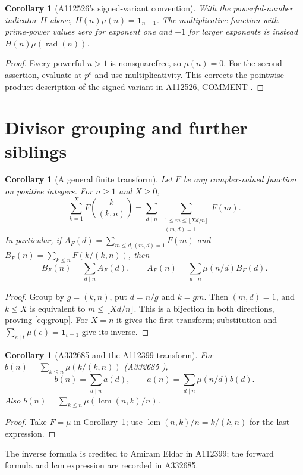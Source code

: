 \documentclass[11pt]{article}
\newtheorem{corollary}[theorem]{Corollary}
\newcommand{\mob}{\mu}
\newcommand{\rad}{\operatorname{rad}}
\begin{document}
\begin{corollary}[A112526's signed-variant convention]\label{cor:signed}
With the powerful-number indicator $H$ above,
$H(n)\mob(n)=\mathbf1_{n=1}$.
The multiplicative function with prime-power values zero for exponent
one and $-1$ for larger exponents is instead $H(n)\mob(\rad(n))$.
\end{corollary}
\begin{proof}
Every powerful $n>1$ is nonsquarefree, so $\mob(n)=0$.
For the second assertion, evaluate at $p^e$ and use multiplicativity.
This corrects the pointwise-product description of the signed variant
in A112526, COMMENT \cite{triangle-aux}.
\end{proof}

\section{Divisor grouping and further siblings}
\begin{corollary}[A general finite transform]\label{cor:group}
Let $F$ be any complex-valued function on positive integers. For $n\geq1$
and $X\geq0$,
\begin{equation}\label{eq:group}
 \sum_{k=1}^{X}F\!\left(\frac{k}{(k,n)}\right)
 =\sum_{d\mid n}\ \sum_{\substack{1\leq m\leq\lfloor Xd/n\rfloor\\(m,d)=1}}F(m).
\end{equation}
In particular, if $A_F(d)=\sum_{m\leq d,(m,d)=1}F(m)$ and
$B_F(n)=\sum_{k\leq n}F(k/(k,n))$, then
\begin{equation}\label{eq:general-transform}
 B_F(n)=\sum_{d\mid n}A_F(d),\qquad
 A_F(n)=\sum_{d\mid n}\mob(n/d)B_F(d).
\end{equation}
\end{corollary}
\begin{proof}
Group by $g=(k,n)$, put $d=n/g$ and $k=gm$.
Then $(m,d)=1$, and $k\leq X$ is equivalent to
$m\leq\lfloor Xd/n\rfloor$. This is a bijection in both directions,
proving \eqref{eq:group}. For $X=n$ it gives the first transform;
substitution and $\sum_{e\mid t}\mob(e)=\mathbf1_{t=1}$ give its inverse.
\end{proof}

\begin{corollary}[A332685 and the A112399 transform]\label{cor:transform}
For $b(n)=\sum_{k\leq n}\mob(k/(k,n))$ (A332685 \cite{a332685}),
\begin{equation}\label{eq:transform}
 b(n)=\sum_{d\mid n}a(d),\qquad
 a(n)=\sum_{d\mid n}\mob(n/d)b(d).
\end{equation}
Also $b(n)=\sum_{k\leq n}\mob(\operatorname{lcm}(n,k)/n)$.
\end{corollary}
\begin{proof}
Take $F=\mob$ in Corollary~\ref{cor:group}; use
$\operatorname{lcm}(n,k)/n=k/(k,n)$ for the last expression.
\end{proof}
The inverse formula is credited to Amiram Eldar in A112399;
the forward formula and lcm expression are recorded in A332685.
\end{document}
